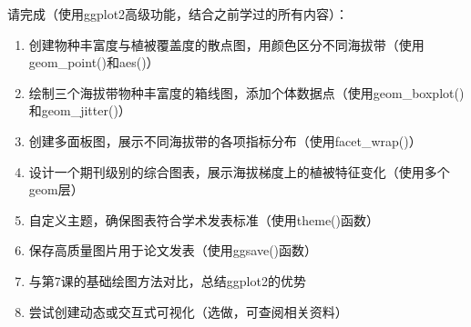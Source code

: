 \documentclass[
]{book}
\begin{document}
请完成（使用ggplot2高级功能，结合之前学过的所有内容）：

\begin{enumerate}
\def\labelenumi{\arabic{enumi}.}
\item
  创建物种丰富度与植被覆盖度的散点图，用颜色区分不同海拔带（使用geom\_point()和aes()）
\item
  绘制三个海拔带物种丰富度的箱线图，添加个体数据点（使用geom\_boxplot()和geom\_jitter()）
\item
  创建多面板图，展示不同海拔带的各项指标分布（使用facet\_wrap()）
\item
  设计一个期刊级别的综合图表，展示海拔梯度上的植被特征变化（使用多个geom层）
\item
  自定义主题，确保图表符合学术发表标准（使用theme()函数）
\item
  保存高质量图片用于论文发表（使用ggsave()函数）
\item
  与第7课的基础绘图方法对比，总结ggplot2的优势
\item
  尝试创建动态或交互式可视化（选做，可查阅相关资料）
\end{enumerate}

  
\end{document}
